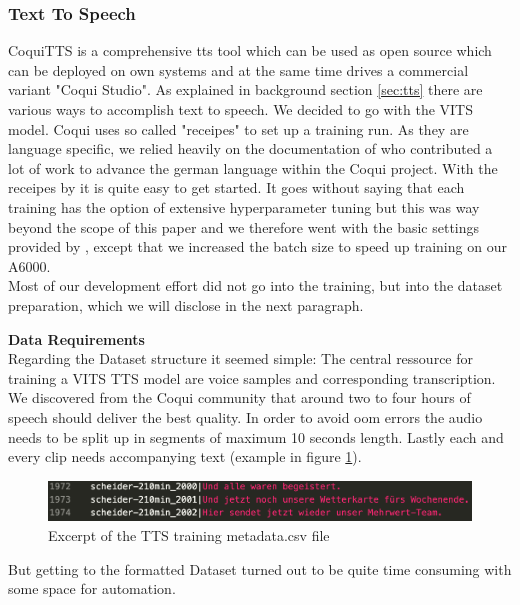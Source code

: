 \documentclass[
  a4paper,  %
  twoside,  %
  bibliography=totoc,
  headsepline,
  cleardoublepage=empty,
  parskip=half,
  draft=false
]{scrbook}
\begin{document}
\subsubsection{Text To Speech}
CoquiTTS is a comprehensive \gls*{tts} tool which can be used as open source which can be deployed on own systems and at the same time drives a commercial variant "Coqui Studio". As explained in background section \ref{sec:tts} there are various ways to accomplish text to speech. We decided to go with the VITS model. Coqui uses so called "receipes" to set up a training run. As they are language specific, we relied heavily on the documentation of  who contributed a lot of work to advance the german language within the Coqui project.
With the receipes by  it is quite easy to get started. It goes without saying that each training has the option of extensive hyperparameter tuning but this was way beyond the scope of this paper and we therefore went with the basic settings provided by , except that we increased the batch size to speed up training on our A6000. \\
Most of our development effort did not go into the training, but into the dataset preparation, which we will disclose in the next paragraph.

\textbf{Data Requirements} \\
Regarding the Dataset structure it seemed simple: The central ressource for training a VITS TTS model are voice samples and corresponding transcription. We discovered from the Coqui community that around two to four hours of speech should deliver the best quality. In order to avoid \gls{oom} errors the audio needs to be split up in segments of maximum 10 seconds length. Lastly each and every clip needs accompanying text (example in figure \ref{fig:metadata.csv}).
\begin{figure}[h]
  \centering
  \includegraphics[width=1\textwidth]{./graphics/images/tts/csv.png}
  \caption{Excerpt of the TTS training metadata.csv file}
  \label{fig:metadata.csv}
\end{figure}
But getting to the formatted Dataset turned out to be quite time consuming with some space for automation.
\end{document}
